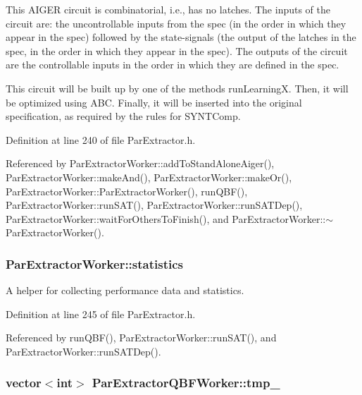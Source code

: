 This A\-I\-G\-E\-R circuit is combinatorial, i.\-e., has no latches. The inputs of the circuit are\-: the uncontrollable inputs from the spec (in the order in which they appear in the spec) followed by the state-\/signals (the output of the latches in the spec, in the order in which they appear in the spec). The outputs of the circuit are the controllable inputs in the order in which they are defined in the spec.

This circuit will be built up by one of the methods run\-Learning\-X. Then, it will be optimized using A\-B\-C. Finally, it will be inserted into the original specification, as required by the rules for S\-Y\-N\-T\-Comp. 

Definition at line 240 of file Par\-Extractor.\-h.



Referenced by Par\-Extractor\-Worker\-::add\-To\-Stand\-Alone\-Aiger(), Par\-Extractor\-Worker\-::make\-And(), Par\-Extractor\-Worker\-::make\-Or(), Par\-Extractor\-Worker\-::\-Par\-Extractor\-Worker(), run\-Q\-B\-F(), Par\-Extractor\-Worker\-::run\-S\-A\-T(), Par\-Extractor\-Worker\-::run\-S\-A\-T\-Dep(), Par\-Extractor\-Worker\-::wait\-For\-Others\-To\-Finish(), and Par\-Extractor\-Worker\-::$\sim$\-Par\-Extractor\-Worker().

\hypertarget{classParExtractorWorker_a5e23f373a7959b56eb6f93036f98a1b1}{
\subsubsection[{statistics}]{ Par\-Extractor\-Worker\-::statistics\hspace{0.3cm}{\ttfamily [inherited]}}}\label{classParExtractorWorker_a5e23f373a7959b56eb6f93036f98a1b1}


A helper for collecting performance data and statistics. 



Definition at line 245 of file Par\-Extractor.\-h.



Referenced by run\-Q\-B\-F(), Par\-Extractor\-Worker\-::run\-S\-A\-T(), and Par\-Extractor\-Worker\-::run\-S\-A\-T\-Dep().

\hypertarget{classParExtractorQBFWorker_ad3df44a54420426b8408c3c72b73f64b}{
\subsubsection[{tmp\-\_\-}]{\setlength{\rightskip}{0pt plus 5cm}vector$<$int$>$ Par\-Extractor\-Q\-B\-F\-Worker\-::tmp\-\_\-\hspace{0.3cm}{\ttfamily [protected]}}}\label{classParExtractorQBFWorker_ad3df44a54420426b8408c3c72b73f64b}


